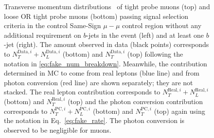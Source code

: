 \begin{figure}[ht!]
{}
\caption{Transverse momentum distributions \pt\ of tight probe 
muons (top) and loose OR tight probe muons (bottom) passing signal 
selection criteria in the control Same-Sign $\mu-\mu$ control region 
without any additional requirement on $b$-jets in the event (left) and 
at least one $b$-jet (right). 
The amount observed in data (black points) corresponds 
to $N_T^{\textrm{Data},i}+N_L^{\textrm{Data},i}$ (bottom) and $N_T^{\textrm{Data},i}$ (top) following the notation
in \eqn\ref{eq:fake_num_breakdown}.
Meanwhile, the contribution determined in MC to come from 
real leptons (blue line) and from photon conversion (red line) are shown 
separately; they are not stacked. The real lepton contribution corresponds to 
$N_T^{\textrm{Real},i}+N_L^{\textrm{Real},i}$ (bottom) and $N_T^{\textrm{Real},i}$ 
(top) and the photon conversion 
contribution 
corresponds to $N_T^{\textrm{PC},i}+N_L^{\textrm{PC},i}$ (bottom) 
and $N_T^{\textrm{PC},i}$ (top) again using the notation 
in Eq.~\ref{eq:fake_rate}. 
The photon conversion is 
observed to be negligible for muons.  }
\label{fig:fakeEff_CRs_muon}
\end{figure}

